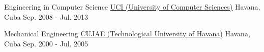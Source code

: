 
\begin{cventries}

  \cventry
    {Engineering in Computer Science} %
    {\faUniversity \hphantom{-} \href{https://www.uci.cu/}{UCI (University of Computer Sciences)}} %
    {Havana, Cuba} %
    {Sep. 2008 - Jul. 2013} %
    {
      \begin{cvitems} %
      \end{cvitems}
    }

  \cventry
    {Mechanical Engineering} %
    {\faUniversity \hphantom{-} \href{http://cujae.edu.cu/}{CUJAE (Technological University of Havana)}} %
    {Havana, Cuba} %
    {Sep. 2000 - Jul. 2005} %
    {
      \begin{cvitems} %
      \end{cvitems}
    }

\end{cventries}

